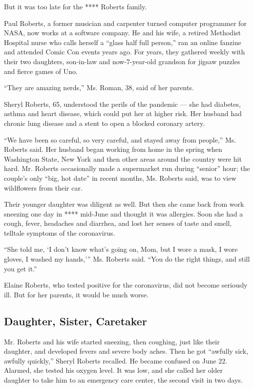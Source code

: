 But it was too late for the **** Roberts family.

Paul Roberts, a former musician and carpenter turned computer programmer
for NASA, now works at a software company. He and his wife, a retired
Methodist Hospital nurse who calls herself a ``glass half full person,''
ran an online fanzine and attended Comic Con events years ago. For
years, they gathered weekly with their two daughters, son-in-law and
now-7-year-old grandson for jigsaw puzzles and fierce games of Uno.

``They are amazing nerds,'' Ms. Roman, 38, said of her parents.

Sheryl Roberts, 65, understood the perils of the pandemic --- she had
diabetes, asthma and heart disease, which could put her at higher risk.
Her husband had chronic lung disease and a stent to open a blocked
coronary artery.

``We have been so careful, so very careful, and stayed away from
people,'' Ms. Roberts said. Her husband began working from home in the
spring when Washington State, New York and then other areas around the
country were hit hard. Mr. Roberts occasionally made a supermarket run
during ``senior'' hour; the couple's only ``big, hot date'' in recent
months, Ms. Roberts said, was to view wildflowers from their car.

Their younger daughter was diligent as well. But then she came back from
work sneezing one day in **** mid-June and thought it was allergies.
Soon she had a cough, fever, headaches and diarrhea, and lost her senses
of taste and smell, telltale symptoms of the coronavirus.

``She told me, `I don't know what's going on, Mom, but I wore a mask, I
wore gloves, I washed my hands,''' Ms. Roberts said. ``You do the right
things, and still you get it.''

Elaine Roberts, who tested positive for the coronavirus, did not become
seriously ill. But for her parents, it would be much worse.

\hypertarget{daughter-sister-caretaker}{%
\subsection{Daughter, Sister,
Caretaker}\label{daughter-sister-caretaker}}

Mr. Roberts and his wife started sneezing, then coughing, just like
their daughter, and developed fevers and severe body aches. Then he got
``awfully sick, awfully quickly,'' Sheryl Roberts recalled. He became
confused on June 22. Alarmed, she tested his oxygen level. It was low,
and she called her older daughter to take him to an emergency care
center, the second visit in two days.

